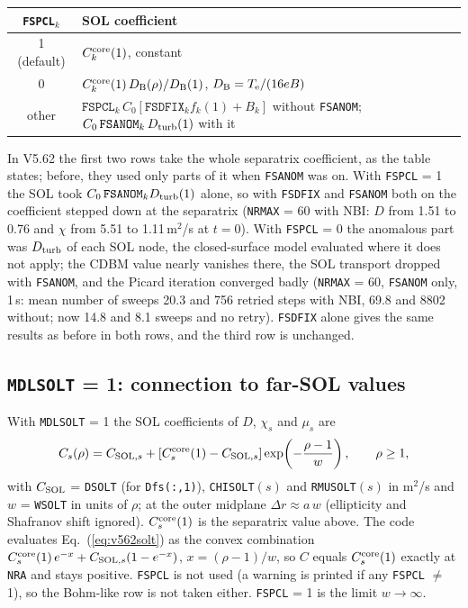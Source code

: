 \documentclass[11pt]{article}
\def\r#1{{\rm#1}}
\begin{document}
\begin{center}
\begin{tabular}{|c|l|}\hline
\texttt{FSPCL}$_k$ & SOL coefficient \\\hline
1 (default) & $C^\r{core}_k(1)$, constant \\
0 & $C^\r{core}_k(1)\,D_\r{B}(\rho)/D_\r{B}(1)$, $D_\r{B} = T_\r{e}/(16eB)$ \\
other & $\texttt{FSPCL}_k\,C_0[\texttt{FSDFIX}_k f_k(1) + B_k]$ without \texttt{FSANOM};
        $C_0\,\texttt{FSANOM}_k\,D_\r{turb}(1)$ with it \\\hline
\end{tabular}
\end{center}

In V5.62 the first two rows take the whole separatrix coefficient, as the table states;
before, they used only parts of it when \texttt{FSANOM} was on.  With \texttt{FSPCL} = 1 the
SOL took $C_0\,\texttt{FSANOM}_k D_\r{turb}(1)$ alone, so with \texttt{FSDFIX} and
\texttt{FSANOM} both on the coefficient stepped down at the separatrix (\texttt{NRMAX} = 60
with NBI: $D$ from 1.51 to 0.76 and $\chi$ from 5.51 to 1.11\,m$^2$/s at $t=0$).  With
\texttt{FSPCL} = 0 the anomalous part was $D_\r{turb}$ of each SOL node, the closed-surface
model evaluated where it does not apply; the CDBM value nearly vanishes there, the SOL
transport dropped with \texttt{FSANOM}, and the Picard iteration converged badly
(\texttt{NRMAX} = 60, \texttt{FSANOM} only, 1\,s: mean number of sweeps 20.3 and 756 retried
steps with NBI, 69.8 and 8802 without; now 14.8 and 8.1 sweeps and no retry).  \texttt{FSDFIX}
alone gives the same results as before in both rows, and the third row is unchanged.

\subsection{\texttt{MDLSOLT} = 1: connection to far-SOL values}

With \texttt{MDLSOLT} = 1 the SOL coefficients of $D$, $\chi_s$ and $\mu_s$ are
\begin{equation}
  C_s(\rho) = C_{\r{SOL},s} + \left[C^\r{core}_s(1) - C_{\r{SOL},s}\right]
  \exp\!\left(-\frac{\rho-1}{w}\right),\qquad \rho\ge1,
  \label{eq:v562solt}
\end{equation}
with $C_\r{SOL}$ = \texttt{DSOLT} (for \texttt{Dfs(:,1)}), \texttt{CHISOLT}$(s)$ and
\texttt{RMUSOLT}$(s)$ in m$^2$/s and $w$ = \texttt{WSOLT} in units of $\rho$; at the outer
midplane $\Delta r\approx a\,w$ (ellipticity and Shafranov shift ignored).  $C^\r{core}_s(1)$
is the separatrix value above.  The code evaluates Eq.~(\ref{eq:v562solt}) as the convex
combination $C^\r{core}_s(1)\,e^{-x} + C_{\r{SOL},s}(1-e^{-x})$, $x=(\rho-1)/w$, so $C$ equals
$C^\r{core}_s(1)$ exactly at \texttt{NRA} and stays positive.  \texttt{FSPCL} is not used
(a warning is printed if any \texttt{FSPCL} $\neq$ 1), so the Bohm-like row is not taken
either.  \texttt{FSPCL} = 1 is the limit $w\to\infty$.
\end{document}
